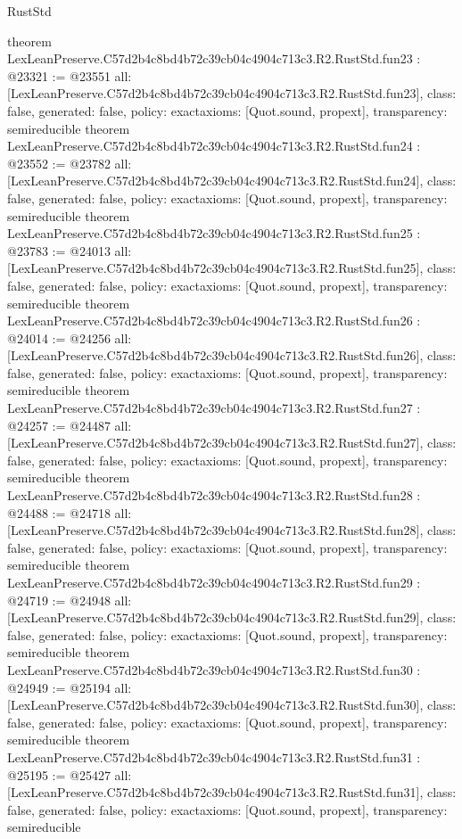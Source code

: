 \begin{lexlean}{RustStd}
\begin{coremodule}
{}
theorem LexLeanPreserve.C57d2b4c8bd4b72c39cb04c4904c713c3.R2.RustStd.fun23 : @23321 := @23551 {
  all: [LexLeanPreserve.C57d2b4c8bd4b72c39cb04c4904c713c3.R2.RustStd.fun23],
  class: false,
  generated: false,
  policy: exact{axioms: [Quot.sound, propext]},
  transparency: semireducible
}
theorem LexLeanPreserve.C57d2b4c8bd4b72c39cb04c4904c713c3.R2.RustStd.fun24 : @23552 := @23782 {
  all: [LexLeanPreserve.C57d2b4c8bd4b72c39cb04c4904c713c3.R2.RustStd.fun24],
  class: false,
  generated: false,
  policy: exact{axioms: [Quot.sound, propext]},
  transparency: semireducible
}
theorem LexLeanPreserve.C57d2b4c8bd4b72c39cb04c4904c713c3.R2.RustStd.fun25 : @23783 := @24013 {
  all: [LexLeanPreserve.C57d2b4c8bd4b72c39cb04c4904c713c3.R2.RustStd.fun25],
  class: false,
  generated: false,
  policy: exact{axioms: [Quot.sound, propext]},
  transparency: semireducible
}
theorem LexLeanPreserve.C57d2b4c8bd4b72c39cb04c4904c713c3.R2.RustStd.fun26 : @24014 := @24256 {
  all: [LexLeanPreserve.C57d2b4c8bd4b72c39cb04c4904c713c3.R2.RustStd.fun26],
  class: false,
  generated: false,
  policy: exact{axioms: [Quot.sound, propext]},
  transparency: semireducible
}
theorem LexLeanPreserve.C57d2b4c8bd4b72c39cb04c4904c713c3.R2.RustStd.fun27 : @24257 := @24487 {
  all: [LexLeanPreserve.C57d2b4c8bd4b72c39cb04c4904c713c3.R2.RustStd.fun27],
  class: false,
  generated: false,
  policy: exact{axioms: [Quot.sound, propext]},
  transparency: semireducible
}
theorem LexLeanPreserve.C57d2b4c8bd4b72c39cb04c4904c713c3.R2.RustStd.fun28 : @24488 := @24718 {
  all: [LexLeanPreserve.C57d2b4c8bd4b72c39cb04c4904c713c3.R2.RustStd.fun28],
  class: false,
  generated: false,
  policy: exact{axioms: [Quot.sound, propext]},
  transparency: semireducible
}
theorem LexLeanPreserve.C57d2b4c8bd4b72c39cb04c4904c713c3.R2.RustStd.fun29 : @24719 := @24948 {
  all: [LexLeanPreserve.C57d2b4c8bd4b72c39cb04c4904c713c3.R2.RustStd.fun29],
  class: false,
  generated: false,
  policy: exact{axioms: [Quot.sound, propext]},
  transparency: semireducible
}
theorem LexLeanPreserve.C57d2b4c8bd4b72c39cb04c4904c713c3.R2.RustStd.fun30 : @24949 := @25194 {
  all: [LexLeanPreserve.C57d2b4c8bd4b72c39cb04c4904c713c3.R2.RustStd.fun30],
  class: false,
  generated: false,
  policy: exact{axioms: [Quot.sound, propext]},
  transparency: semireducible
}
theorem LexLeanPreserve.C57d2b4c8bd4b72c39cb04c4904c713c3.R2.RustStd.fun31 : @25195 := @25427 {
  all: [LexLeanPreserve.C57d2b4c8bd4b72c39cb04c4904c713c3.R2.RustStd.fun31],
  class: false,
  generated: false,
  policy: exact{axioms: [Quot.sound, propext]},
  transparency: semireducible
}
\end{coremodule}
\end{lexlean}
